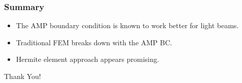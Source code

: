 \documentclass[8pt]{beamer}
\begin{document}
\begin{frame}
    \frametitle{Summary}
    \begin{itemize}
        \item The AMP boundary condition is known to work better for light beams.
        \item Traditional FEM breaks down with the AMP BC.
        \item Hermite element approach appears promising.
    \end{itemize}
\end{frame}

\begin{frame}
    \begin{center}
    \textcolor{RPIred}{\Huge Thank You!}
    \end{center}
\end{frame}

\begin{frame}[allowframebreaks]
    
    \tiny
    {
    
    }
\end{frame}
\end{document}
